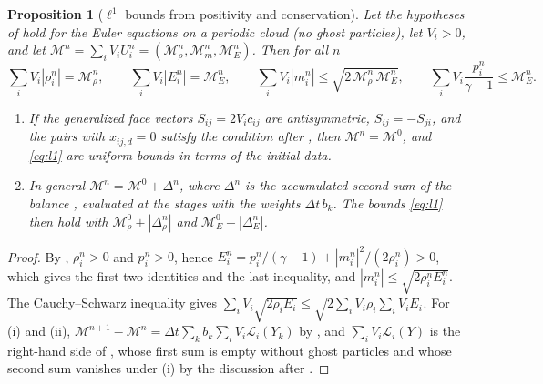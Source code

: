 \documentclass[11pt,a4paper]{article}
\theoremstyle{plain}
\newtheorem{proposition}[theorem]{Proposition}
\theoremstyle{definition}
\theoremstyle{remark}
\numberwithin{equation}{section}
\newcommand{\Lop}{\mathcal{L}}
\newcommand{\A}[1]{\cite[#1]{Addendum}}
\begin{document}
\begin{proposition}[$\ell^1$ bounds from positivity and conservation]\label{prop:euler}
Let the hypotheses of \A{Thm.~6.3} hold for the Euler equations \A{(2.2)} on a periodic cloud (no ghost particles), let $V_i>0$, and let $\mathcal{M}^n=\sum_{i}V_iU^n_i=(\mathcal{M}^n_\rho,\mathcal{M}^n_m,\mathcal{M}^n_E)$. Then for all $n$
\begin{equation}\label{eq:l1}
\sum_iV_i|\rho^n_i|=\mathcal{M}^n_\rho,\qquad \sum_iV_i|E^n_i|=\mathcal{M}^n_E,\qquad \sum_iV_i|m^n_i|\le\sqrt{2\,\mathcal{M}^n_\rho\,\mathcal{M}^n_E},\qquad \sum_iV_i\frac{p^n_i}{\gamma-1}\le\mathcal{M}^n_E .
\end{equation}
\begin{enumerate}[label=(\roman*)]
\item If the generalized face vectors $S_{ij}=2V_ic_{ij}$ are antisymmetric, $S_{ij}=-S_{ji}$, and the pairs with $x_{ij,d}=0$ satisfy the condition after \A{Prop.~4.4}, then $\mathcal{M}^n=\mathcal{M}^0$, and \eqref{eq:l1} are uniform bounds in terms of the initial data.
\item In general $\mathcal{M}^{n}=\mathcal{M}^0+\Delta^n$, where $\Delta^n$ is the accumulated second sum of the balance \A{(4.6)}, evaluated at the stages with the weights $\Delta t\,b_k$. The bounds \eqref{eq:l1} then hold with $\mathcal{M}^0_\rho+|\Delta^n_\rho|$ and $\mathcal{M}^0_E+|\Delta^n_E|$.
\end{enumerate}
\end{proposition}

\begin{proof}
By \A{Thm.~6.3}, $\rho^n_i>0$ and $p^n_i>0$, hence $E^n_i=p^n_i/(\gamma-1)+|m^n_i|^2/(2\rho^n_i)>0$, which gives the first two identities and the last inequality, and $|m^n_i|\le\sqrt{2\rho^n_iE^n_i}$. The Cauchy--Schwarz inequality gives $\sum_iV_i\sqrt{2\rho_iE_i}\le\sqrt{2\sum_iV_i\rho_i\sum_iV_iE_i}$. For (i) and (ii), $\mathcal{M}^{n+1}-\mathcal{M}^n=\Delta t\sum_kb_k\sum_iV_i\Lop_i(Y_k)$ by \A{(6.1)}, and $\sum_iV_i\Lop_i(Y)$ is the right-hand side of \A{(4.6)}, whose first sum is empty without ghost particles and whose second sum vanishes under (i) by the discussion after \A{Prop.~4.4}.
\end{proof}
\end{document}
